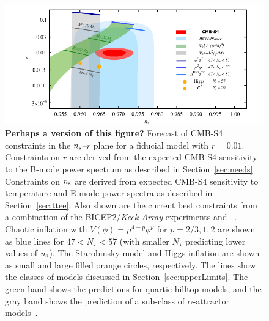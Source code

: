 \begin{figure}[ht]
\begin{center}
\includegraphics[width=6in]{figs/nsrlabeledrp01v10s}
\end{center}
\caption{{\bf Perhaps a version of this figure?} Forecast of CMB-S4 constraints in the $n_{\rm s}$--$r$ plane for a fiducial model with $r=0.01$. Constraints 
on $r$ are derived from the expected CMB-S4 sensitivity to the B-mode power spectrum as described in 
Section~\ref{sec:needs}. Constraints on $n_{\rm s}$ are derived from expected CMB-S4 sensitivity to temperature and 
E-mode power spectra as described in Section~\ref{sec:ttee}. Also shown are the current best constraints from a combination of the { BICEP}2/{\em Keck Array} experiments and \planck\ \cite{Array:2015xqh}. Chaotic inflation with $V(\phi)=\mu^{4-p}\phi^p$ for \mbox{$p=2/3,1,2$} are shown as blue lines for $47<N_\star<57$ (with smaller $N_\star$ predicting lower values of $n_{\rm s}$). The Starobinsky model and Higgs inflation are shown as small and large filled orange circles, respectively. The lines show the classes of models discussed in Section~\ref{sec:upperLimits}. The green band shows the predictions for quartic hilltop models, and the gray band shows the prediction of a sub-class of $\alpha$-attractor models~\cite{Kallosh:2013hoa}.
}
\label{fig:nsrp01}
\end{figure}

